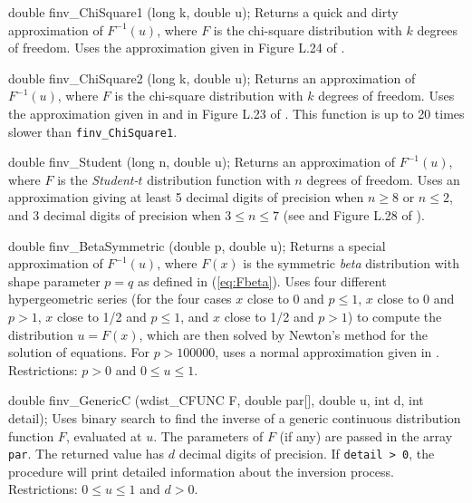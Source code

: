 double finv_ChiSquare1 (long k, double u);
\endcode
  \tab
  Returns a quick and dirty approximation of $F^{-1}(u)$,
  where $F$ is the chi-square distribution with $k$ degrees of freedom.
  Uses the approximation given in  Figure L.24 of \cite{sBRA87a}.
 \endtab
\code


double finv_ChiSquare2 (long k, double u);
\endcode
  \tab
  Returns an approximation of $F^{-1}(u)$, where $F$ is the
  chi-square distribution with $k$ degrees of freedom.
  Uses the approximation given in \cite{tBES75a}
  and in Figure L.23 of \cite{sBRA87a}. This function is up to
  20 times slower than {\tt finv\_ChiSquare1}.
 \endtab
\code


double finv_Student (long n, double u);
\endcode
  \tab
  Returns an approximation of $F^{-1}(u)$, where $F$ is the
  {\em Student-$t$\/} distribution function with $n$ degrees of freedom.
  Uses an approximation giving at least
  5 decimal digits of precision when $n \ge 8$ or $n\le 2$, and
  3 decimal digits of precision when $3\le n \le 7$
  (see \cite{tHIL70a} and Figure L.28 of \cite{sBRA87a}).
  \endtab
\code


double finv_BetaSymmetric (double p, double u);
\endcode
  \tab
  Returns a special approximation of $F^{-1}(u)$, where $F(x)$ is the
  symmetric {\it beta} distribution with shape parameter $p = q$
  as defined in (\ref{eq:Fbeta}). Uses four different hypergeometric series
  (for the four cases $x$ close to 0 and $p \le 1$,
     $x$ close to 0 and $p > 1$,  $x$ close to 1/2 and $p \le 1$,
  and  $x$ close to 1/2 and $p > 1$)
  to compute the distribution $u = F(x)$,
  which are then solved by Newton's method for the solution of equations.
  For $p > 100000$, uses a normal approximation given in \cite{tPEI68a}.
  Restrictions: $p > 0$ and $0 \le u \le 1$.
 \endtab
\code


double finv_GenericC (wdist_CFUNC F, double par[], double u, int d,
                      int detail);
\endcode
  \tab
   Uses binary search to find the inverse of a generic continuous
   distribution function $F$, evaluated at $u$.
   The parameters of $F$ (if any) are passed in the array {\tt par}.
   The returned value has $d$ decimal digits of precision.
   If {\tt detail > 0}, the procedure will print detailed information
   about the inversion process.
   Restrictions: $0 \le u \le 1$ and $d>0$.
  \endtab

\newpage
\hide
\code

